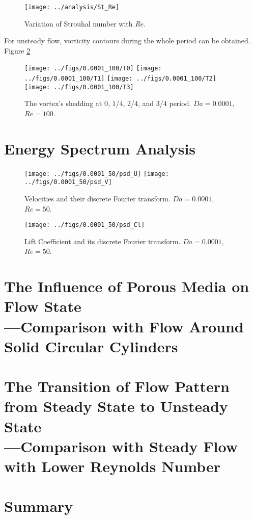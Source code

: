 \begin{figure}[H]
	\centering
	\texttt{[image: ../analysis/St\_Re]}
	\caption{Variation of Strouhal number with $Re$.}
	\label{fig: St}
\end{figure}

For unsteady flow, vorticity contours during the whole period can be obtained. Figure \ref{fig: 4*vortex}

\begin{figure}[H]
	\centering
	{\texttt{[image: ../figs/0.0001\_100/T0]}}
	{\texttt{[image: ../figs/0.0001\_100/T1]}}
	{\texttt{[image: ../figs/0.0001\_100/T2]}}
	{\texttt{[image: ../figs/0.0001\_100/T3]}}
	\caption{The vortex's shedding at 0, 1/4, 2/4, and 3/4 period.
		$Da=0.0001$, $Re=100$.}
	\label{fig: 4*vortex}
\end{figure}


\section{Energy Spectrum Analysis} %
\begin{figure}[H]
	\centering
	\texttt{[image: ../figs/0.0001\_50/psd\_U]}
	\texttt{[image: ../figs/0.0001\_50/psd\_V]}
	\caption{Velocities and their discrete Fourier transform. $Da=0.0001$, $Re=50$.}
\end{figure}
\begin{figure}
	\centering
	\texttt{[image: ../figs/0.0001\_50/psd\_Cl]}
	\caption{Lift Coefficient and its discrete Fourier transform. $Da=0.0001$, $Re=50$.}
\end{figure}


\section{The Influence of Porous Media on Flow State\\
	---Comparison with Flow Around Solid Circular Cylinders}


\section{The Transition of Flow Pattern from Steady State to Unsteady State\\
	---Comparison with Steady Flow with Lower Reynolds Number}


\section{Summary}
